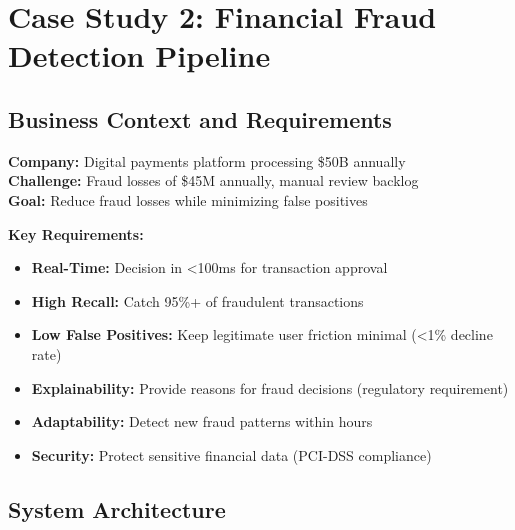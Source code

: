 \section{Case Study 2: Financial Fraud Detection Pipeline}

\subsection{Business Context and Requirements}

\textbf{Company:} Digital payments platform processing \$50B annually\\
\textbf{Challenge:} Fraud losses of \$45M annually, manual review backlog\\
\textbf{Goal:} Reduce fraud losses while minimizing false positives

\textbf{Key Requirements:}

\begin{itemize}
    \item \textbf{Real-Time:} Decision in <100ms for transaction approval
    \item \textbf{High Recall:} Catch 95\%+ of fraudulent transactions
    \item \textbf{Low False Positives:} Keep legitimate user friction minimal (<1\% decline rate)
    \item \textbf{Explainability:} Provide reasons for fraud decisions (regulatory requirement)
    \item \textbf{Adaptability:} Detect new fraud patterns within hours
    \item \textbf{Security:} Protect sensitive financial data (PCI-DSS compliance)
\end{itemize}

\subsection{System Architecture}

